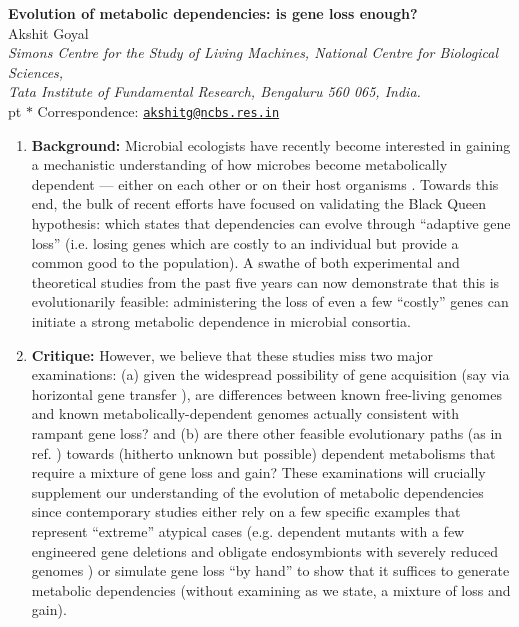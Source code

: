 \documentclass[10pt,a4paper]{article}
\begin{document}
{\begin{center}
{\large
\textbf{Evolution of metabolic dependencies: is gene loss enough?}
}
\\
\vskip 5pt 
\normalsize
Akshit Goyal
\\
\vskip 5pt 
\emph{Simons Centre for the Study of Living Machines, National Centre for Biological Sciences, \\ Tata Institute of Fundamental Research, Bengaluru 560 065, India.}
\\
 pt
$\ast$ Correspondence: \href{mailto:akshitg@ncbs.res.in}{\texttt{akshitg@ncbs.res.in}}
\end{center}
}

\vskip 15pt

\begin{enumerate}[leftmargin=*, label={}]

    \item \textbf{Background:} Microbial ecologists have recently become interested in gaining a mechanistic understanding of how microbes become metabolically dependent — either on each other or on their host organisms \cite{stewart2012growing, giovannoni2014implications, pande2017bacterial}. Towards this end, the bulk of recent efforts have focused on validating the Black Queen hypothesis: which states that dependencies can evolve through ``adaptive gene loss'' \cite{morris2012black, wolf2013genome, fullmer2015pan} (i.e. losing genes which are costly to an individual but provide a common good to the population). A swathe of both experimental \cite{pande2014fitness, koskiniemi2012selection, d2014less, campbell2015self, d2015plasticity, hoek2016resource} and theoretical \cite{pal2006chance, bolotin2016bacterial, mas2016beyond, mcnally2017metabolic, zomorrodi2017genome} studies from the past five years can now demonstrate that this is evolutionarily feasible: administering the loss of even a few ``costly'' genes can initiate a strong metabolic dependence in microbial consortia. 

    \item \textbf{Critique:} However, we believe that these studies miss two major examinations: (a) given the widespread possibility of gene acquisition (say via horizontal gene transfer \cite{press2016evolutionary}), are differences between known free-living genomes and known metabolically-dependent genomes actually consistent with rampant gene loss? and (b) are there other feasible evolutionary paths (as in ref. \cite{mcnally2017metabolic}) towards (hitherto unknown but possible) dependent metabolisms that require a mixture of gene loss and gain? These examinations will crucially supplement our understanding of the evolution of metabolic dependencies since contemporary studies either rely on a few specific examples that represent ``extreme'' atypical cases (e.g. dependent mutants with a few engineered gene deletions \cite{pande2014fitness, d2014less} and obligate endosymbionts with severely reduced genomes \cite{mccutcheon2012extreme, moran2014tiniest}) or simulate gene loss ``by hand'' to show that it suffices to generate metabolic dependencies (without examining as we state, a mixture of loss and gain).


\end{enumerate}
\end{document}
